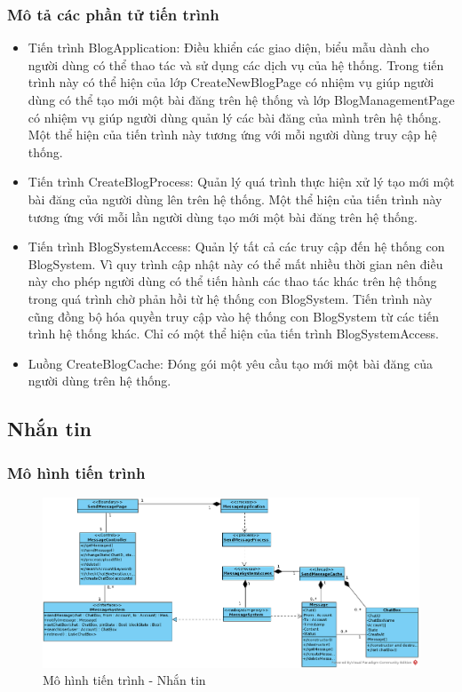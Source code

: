 \documentclass[./../main.tex]{subfiles}
\begin{document}
\subsubsection{Mô tả các phần tử tiến trình}
\begin{itemize}
	\item Tiến trình BlogApplication: Điều khiển các giao diện, biểu mẫu dành cho người dùng có thể thao tác và sử dụng các dịch vụ của hệ thống. Trong tiến trình này có thể hiện của lớp CreateNewBlogPage có nhiệm vụ giúp người dùng có thể tạo mới một bài đăng trên hệ thống và lớp BlogManagementPage có nhiệm vụ giúp người dùng quản lý các bài đăng của mình trên hệ thống.
	      Một thể hiện của tiến trình này tương ứng với mỗi người dùng truy cập hệ thống.
	\item Tiến trình CreateBlogProcess: Quản lý quá trình thực hiện xử lý tạo mới một bài đăng của người dùng lên trên hệ thống.
	      Một thể hiện của tiến trình này tương ứng với mỗi lần người dùng tạo mới một bài đăng trên hệ thống.
	\item Tiến trình BlogSystemAccess: Quản lý tất cả các truy cập đến hệ thống con BlogSystem. Vì quy trình cập nhật này có thể mất nhiều thời gian nên điều này cho phép người dùng có thể tiến hành các thao tác khác trên hệ thống trong quá trình chờ phản hồi từ hệ thống con BlogSystem. Tiến trình này cũng đồng bộ hóa quyền truy cập vào hệ thống con BlogSystem từ các tiến trình hệ thống khác.
	      Chỉ có một thể hiện của tiến trình BlogSystemAccess.
	\item Luồng CreateBlogCache: Đóng gói một yêu cầu tạo mới một bài đăng của người dùng trên hệ thống.
\end{itemize}

\subsection{Nhắn tin}

\subsubsection{Mô hình tiến trình}

\begin{figure}[H]
	\centering
	\includegraphics[width=\linewidth]{./images/pv_Message.png}
\caption{Mô hình tiến trình - Nhắn tin}
\end{figure}
\end{document}
